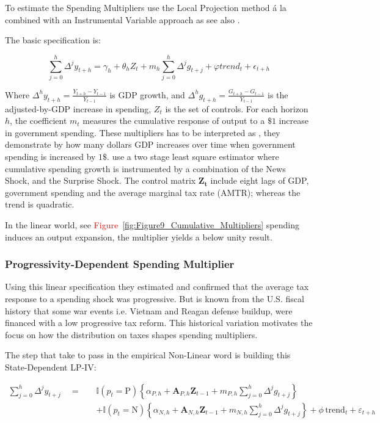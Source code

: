 \documentclass[12pt,letterpaper]{article}
\begin{document}
To estimate the Spending Multipliers \cite{FN} use the Local Projection method á la \cite{Jordà2005} combined with an Instrumental Variable approach as \cite{RameyZubairy2018} see also \cite{JordàTaylo2025LP-IV}.

The basic specification is:

\begin{equation}
    \sum^{h}_{j=0} \Delta^j y_{t+h} = \gamma_h + \theta_hZ_t + m_h\sum^{h}_{j=0}\Delta^jg_{t+j} + \varphi trend_t + \epsilon_{t+h}
\end{equation}

Where $\Delta^hy_{t+h} = \frac{Y_{t+h}-Y_{t-1}}{Y_{t-1}}$ is GDP growth, and $\Delta^hg_{t+h} = \frac{G_{t+h}-G_{t-1}}{Y_{t-1}}$ is the adjusted-by-GDP increase in spending, $Z_t$ is the set of controls.
For each horizon $h$, the coefficient $m_t$ measures the cumulative response of output to a $\$1$ increase in government spending. 
These multipliers has to be interpreted as \cite{Auerbach_Gorodnichenko_2012_Measuring}, they demonstrate by how many dollars GDP increases over time when government spending is increased by $1\$$. 
\cite{FN} use a two stage least square estimator where cumulative spending growth is instrumented by a combination of the \cite{RameyZubairy2018} News Shock, and the \cite{BP} Surprise Shock.
The control matrix $\bm{Z_t}$ include eight lags of GDP, government spending and the average marginal tax rate (AMTR); whereas the trend is quadratic.

In the \cite{FN} linear world, see \textcolor{red}{Figure~\ref{fig:Figure9_Cumulative_Multipliers}} spending induces an output expansion, the multiplier yields a below unity result.


\subsubsection{Progressivity-Dependent Spending Multiplier}

Using this linear specification they estimated and confirmed that the average tax response to a spending shock was progressive.
But is known from the U.S. fiscal history that some war events i.e. Vietnam and Reagan defense buildup, were financed with a low progressive tax reform. 
This historical variation motivates
the focus on how the distribution on taxes shapes spending multipliers.

The step that \cite{FN} take to pass in the empirical Non-Linear word is building this State-Dependent LP-IV:

\begin{equation}
    \begin{split}
        \sum_{j=0}^{h} \Delta^j y_{t+j} \quad = \quad & \mathbb{I}(p_t = \text{P}) \left\{ \alpha_{P,h} + \bm{A}_{P,h} \bm{Z}_{t-1} + m_{P,h} \sum_{j=0}^{h} \Delta^j g_{t+j} \right\} \\
        & + \mathbb{I}(p_t = \text{N}) \left\{ \alpha_{N,h} + \bm{A}_{N,h} \bm{Z}_{t-1} + m_{N,h} \sum_{j=0}^{h} \Delta^j g_{t+j} \right\} + \phi \, \text{trend}_t + \varepsilon_{t+h}
    \end{split} 
    \label{eq:LP-IV_FN_Model}
\end{equation}
\end{document}
